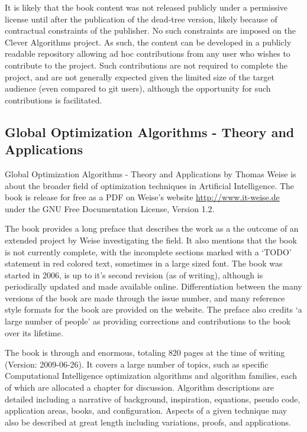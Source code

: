\documentclass[a4paper, 11pt]{article}
\begin{document}
It is likely that the book content was not released publicly under a permissive license until after the publication of the dead-tree version, likely because of contractual constraints of the publisher. No such constraints are imposed on the Clever Algorithms project. As such, the content can be developed in a publicly readable repository allowing ad hoc contributions from any user who wishes to contribute to the project. Such contributions are not required to complete the project, and are not generally expected given the limited size of the target audience (even compared to git users), although the opportunity for such contributions is facilitated.


% 
% 
\subsection{Global Optimization Algorithms - Theory and Applications}
Global Optimization Algorithms - Theory and Applications by Thomas Weise \cite{Weise2007} is about the broader field of optimization techniques in Artificial Intelligence. The book is release for free as a PDF on Weise's website \url{http://www.it-weise.de} under the GNU Free Documentation License, Version 1.2. 

The book provides a long preface that describes the work as a the outcome of an extended project by Weise investigating the field. It also mentions that the book is not currently complete, with the incomplete sections marked with a `TODO' statement in red colored text, sometimes in a large sized font. The book was started in 2006, is up to it's second revision (as of writing), although is periodically updated and made available online. Differentiation between the many versions of the book are made through the issue number, and many reference style formats for the book are provided on the website. The preface also credits `a large number of people' as providing corrections and contributions to the book over its lifetime.

The book is through and enormous, totaling 820 pages at the time of writing (Version: 2009-06-26). It covers a large number of topics, such as specific Computational Intelligence optimization algorithms and algorithm families, each of which are allocated a chapter for discussion. Algorithm descriptions are detailed including a narrative of background, inspiration, equations, pseudo code, application areas, books, and configuration. Aspects of a given technique may also be described at great length including variations, proofs, and applications.
\end{document}
